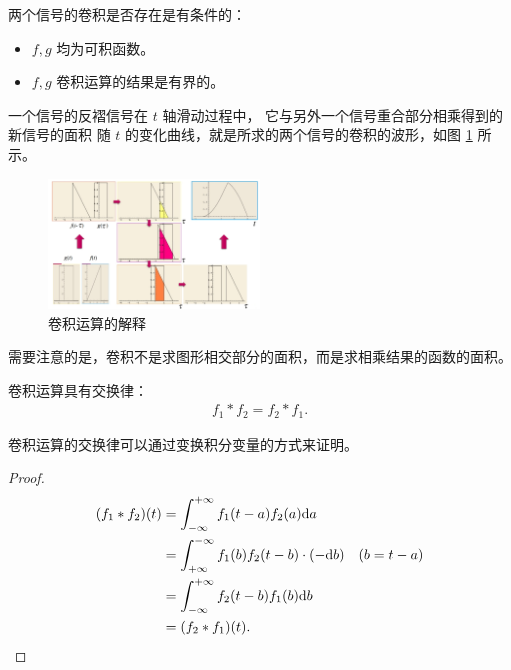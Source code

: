 \begin{remark}
    两个信号的卷积是否存在是有条件的：
    \begin{itemize}
        \item $f, g$ 均为可积函数。
        \item $f, g$ 卷积运算的结果是有界的。
    \end{itemize}
\end{remark}

\begin{note}
    一个信号的反褶信号在 $t$ 轴滑动过程中，
    它与另外一个信号重合部分相乘得到的新信号的面积
    随 $t$ 的变化曲线，就是所求的两个信号的卷积的波形，如图 \ref{fig:convolution-explanation} 所示。
    \begin{figure}[H]
        \centering
        \includegraphics[width=0.5\textwidth]{chap1/img/convolution-explanation.png}
        \caption{卷积运算的解释}
        \label{fig:convolution-explanation}
    \end{figure}
    需要注意的是，卷积不是求图形相交部分的面积，而是求相乘结果的函数的面积。
\end{note}

\begin{property}[卷积运算的交换律]
    卷积运算具有交换律：
    \begin{align*}
        f_1 * f_2 = f_2 * f_1.
    \end{align*}
\end{property}

卷积运算的交换律可以通过变换积分变量的方式来证明。

\begin{proof}
    \begin{align*}
        (f_1 * f_2)(t) & = \int_{-\infty}^{+\infty}f_1(t - a)f_2(a)\mathrm{d}a \\
        & = \int_{+\infty}^{-\infty}f_1(b)f_2(t - b)\cdot (-\mathrm{d}b) \quad (b = t - a) \\
        & = \int_{-\infty}^{+\infty}f_2(t - b)f_1(b)\mathrm{d}b \\
        & = (f_2 * f_1)(t).
    \end{align*}
\end{proof}

